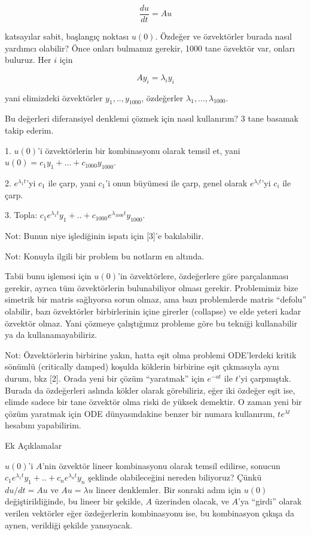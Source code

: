 \documentclass[12pt,fleqn]{article}\usepackage{../../common}
\begin{document}
$$ \frac{du}{dt} = Au $$

katsayılar sabit, başlangıç noktası $u(0)$. Özdeğer ve özvektörler burada
nasıl yardımcı olabilir? Önce onları bulmamız gerekir, 1000 tane özvektör
var, onları buluruz. Her $i$ için 

$$ Ay_i = \lambda_i y_i $$

yani elimizdeki özvektörler $y_1,..,y_{1000}$, özdeğerler
$\lambda_1,...,\lambda_{1000}$. 

Bu değerleri diferansiyel denklemi çözmek için nasıl kullanırım? 3 tane
basamak takip ederim.

1. $u(0)$'i özvektörlerin bir kombinasyonu olarak temsil et, yani
 $u(0) = c_1y_1 + ... + c_{1000}y_{1000}$. 

2. $e^{\lambda_1t}$'yi $c_1$ ile çarp, yani $c_1$'i onun büyümesi ile
çarp, genel olarak $e^{\lambda_it}$'yi $c_i$ ile çarp. 

3. Topla: $c_1e^{\lambda_1t}y_1 + .. + c_{1000}e^{\lambda_{1000}
  t}y_{1000}$. 

Not: Bunun niye işlediğinin ispatı için [3]'e bakılabilir.

Not: Konuyla ilgili bir problem bu notların en altında.

Tabii bunu işlemesi için $u(0)$'in özvektörlere, özdeğerlere göre
parçalanması gerekir, ayrıca tüm özvektörlerin bulunabiliyor olması
gerekir. Problemimiz bize simetrik bir matris sağlıyorsa sorun olmaz, ama
bazı problemlerde matris ``defolu'' olabilir, bazı özvektörler
birbirlerinin içine girerler (collapse) ve elde yeteri kadar özvektör
olmaz. Yani çözmeye çalıştığımız probleme göre bu tekniği kullanabilir ya
da kullanamayabiliriz. 

Not: Özvektörlerin birbirine yakın, hatta eşit olma problemi ODE'lerdeki
kritik sönümlü (critically damped) koşulda köklerin birbirine eşit
çıkmasıyla aynı durum, bkz [2]. Orada yeni bir çözüm ``yaratmak'' için
$e^{-at}$ ile $t$'yi çarpmıştık. Burada da özdeğerleri aslında kökler
olarak görebiliriz, eğer iki özdeğer eşit ise, elimde sadece bir tane
özvektör olma riski de yüksek demektir. O zaman yeni bir çözüm yaratmak
için ODE dünyasındakine benzer bir numara kullanırım, $te^{\lambda t}$
hesabını yapabilirim.

Ek Açıklamalar

$u(0)$'i $A$'nin özvektör lineer kombinasyonu olarak temsil edilirse,
sonucun $c_1e^{\lambda_1t}y_1 + .. + c_ne^{\lambda_n t}y_n$ şeklinde
olabileceğini nereden biliyoruz?  Çünkü $du/dt = Au$ ve $Au = \lambda u$
lineer denklemler. Bir sonraki adım için $u(0)$ değiştirildiğinde, bu
lineer bir şekilde, $A$ üzerinden olacak, ve $A$'ya ``girdi'' olarak
verilen vektörler eğer özdeğerlerin kombinasyonu ise, bu kombinasyon çıkışa
da aynen, verildiği şekilde yansıyacak.
\end{document}
